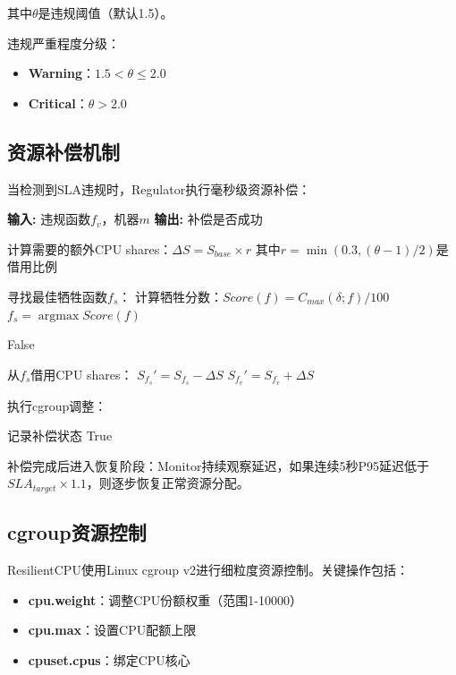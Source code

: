 \documentclass[11pt, a4paper, oneside]{article}
\DeclareMathOperator*{\argmax}{argmax}
\begin{document}
其中$\theta$是违规阈值（默认1.5）。

违规严重程度分级：
\begin{itemize}
    \item \textbf{Warning}：$1.5 < \theta \leq 2.0$
    \item \textbf{Critical}：$\theta > 2.0$
\end{itemize}

\subsection{资源补偿机制}

当检测到SLA违规时，Regulator执行毫秒级资源补偿：

\begin{algorithm}[H]
\caption{资源补偿算法}
\begin{algorithmic}
\STATE \textbf{输入:} 违规函数$f_v$，机器$m$
\STATE \textbf{输出:} 补偿是否成功

\STATE 计算需要的额外CPU shares：$\Delta S = S_{base} \times r$
\STATE 其中$r = \min(0.3, (\theta - 1) / 2)$是借用比例

\STATE 寻找最佳牺牲函数$f_s$：
    \STATE 计算牺牲分数：$Score(f) = C_{max}(\delta; f) / 100$
\ENDFOR
\STATE $f_s = \argmax Score(f)$

    \STATE \RETURN False
\ENDIF

\STATE 从$f_s$借用CPU shares：
\STATE $S_{f_s}' = S_{f_s} - \Delta S$
\STATE $S_{f_v}' = S_{f_v} + \Delta S$

\STATE 执行cgroup调整：
\STATE {}
\STATE {}

\STATE 记录补偿状态
\STATE \RETURN True
\end{algorithmic}
\end{algorithm}

补偿完成后进入恢复阶段：Monitor持续观察延迟，如果连续5秒P95延迟低于$SLA_{target} \times 1.1$，则逐步恢复正常资源分配。

\subsection{cgroup资源控制}

ResilientCPU使用Linux cgroup v2进行细粒度资源控制。关键操作包括：

\begin{itemize}
    \item \textbf{cpu.weight}：调整CPU份额权重（范围1-10000）
    \item \textbf{cpu.max}：设置CPU配额上限
    \item \textbf{cpuset.cpus}：绑定CPU核心
\end{itemize}
\end{document}
